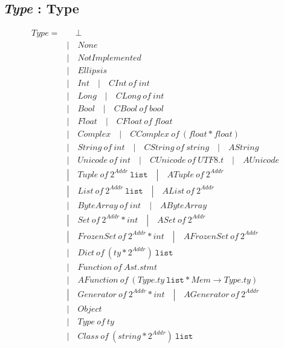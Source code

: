 \documentclass[10pt]{article}
\begin{document}
\subsection{\textit{Type} : Type}
\begin{align*}
  \mathit{Type} = & \quad \bot  \\
  & | \quad \mathit{None}\\
  & | \quad \mathit{NotImplemented}\\
  & | \quad \mathit{Ellipsis}\\
  & | \quad \mathit{Int} \quad  | \quad \mathit{CInt\ of \ int}\\
  & | \quad \mathit{Long} \quad  | \quad \mathit{CLong\ of \ int}\\
  & | \quad \mathit{Bool} \quad | \quad \mathit{CBool\ of \ bool}\\
  & | \quad \mathit{Float} \quad | \quad \mathit{CFloat\ of \ float}\\
  & | \quad \mathit{Complex} \quad | \quad \mathit{CComplex\ of \ (float * float)}\\
  & | \quad \mathit{String\ of \ int } \quad  | \quad \mathit{CString\
    of \ string} \quad | \quad \mathit{AString}\\
  & | \quad \mathit{Unicode\ of \ int } \quad  | \quad \mathit{CUnicode\ of \ UTF8.t} \quad | \quad \mathit{AUnicode       }\\
  & | \quad \mathit{Tuple\ of \ 2^{\mathit{Addr}} \ \mathtt{list} } \quad  | \quad \mathit{ATuple\ of \ 2^{\mathit{Addr}}     }\\
  & | \quad \mathit{List\ of \ 2^{\mathit{Addr}} \ \mathtt{list}  }
  \quad  | \quad \mathit{AList\ of \ 2^{\mathit{Addr}}     }\\
  & | \quad \mathit{ByteArray\ of \ int  } \quad | \quad \mathit{AByteArray        }\\
  & | \quad \mathit{Set\ of \ 2^{\mathit{Addr}} * int   } \quad | \quad \mathit{ASet\ of \ 2^{\mathit{Addr}}              }\\
  & | \quad \mathit{FrozenSet\ of \ 2^{\mathit{Addr}} * int   } \quad | \quad \mathit{AFrozenSet\ of \ 2^{\mathit{Addr}}        }\\
  & | \quad \mathit{Dict\ of \ (ty * 2^{\mathit{Addr}}) \ \mathtt{list}  }\\
  & | \quad \mathit{Function\ of \ Ast.stmt }\\
  & | \quad \mathit{AFunction\ of \ (Type.ty \ \mathtt{list} * \mathit{Mem} \to Type.ty) }\\
  & | \quad \mathit{Generator\ of \ 2^{\mathit{Addr}} * int  } \quad  | \quad \mathit{AGenerator\ of \ 2^{\mathit{Addr}}       }\\
  & | \quad \mathit{Object                 }\\
  & | \quad \mathit{Type\ of \ ty             }\\
  & | \quad \mathit{Class\ of \ (string * 2^{\mathit{Addr}}) \ \mathtt{list}}
\end{align*}
\end{document}
